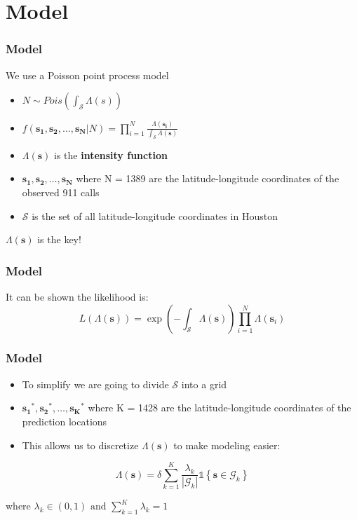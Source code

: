 \documentclass[10pt, compress]{beamer}
\begin{document}
  \section{Model}
  \begin{frame}
    \frametitle{Model}
    We use a Poisson point process model
      \begin{itemize}
        \item $N \sim Pois(\int_{\mathcal{S}} \Lambda(s))$
        \item $f(\mathbf{s_1}, \mathbf{s_2}, \dots, \mathbf{s_N}|N) = \prod_{i=1}^{N} \frac{\Lambda(\mathbf{s_i})}{\int_{\mathcal{S}}\Lambda(\mathbf{s})}$ 
        \item $\Lambda(\mathbf{s})$ is the \textbf{intensity function}
        \item $\mathbf{s_1}, \mathbf{s_2}, \dots, \mathbf{s_N}$ where N = 1389 are the latitude-longitude coordinates of the observed 911 calls
        \item $\mathcal{S}$ is the set of all latitude-longitude coordinates in Houston
      \end{itemize}
    \pause
    $\Lambda(\mathbf{s})$ is the key!
  \end{frame}
  \begin{frame}
    \frametitle{Model}
    It can be shown the likelihood is:
      $$L(\Lambda(\mathbf{s})) = \exp\left(-\int_{\mathcal{S}}\Lambda(\mathbf{s})\right) \prod_{i=1}^{N}\Lambda(\mathbf{s}_i)$$
  \end{frame}
  \begin{frame}
    \frametitle{Model}
    \begin{itemize}
      \item To simplify we are going to divide $\mathcal{S}$ into a grid
      \item $\mathbf{s_1}^{*}, \mathbf{s_2}^{*}, \dots, \mathbf{s_K}^{*}$ where K = 1428 are the latitude-longitude coordinates of the  prediction locations
      \item This allows us to discretize $\Lambda(\mathbf{s})$ to make modeling easier:
    \end{itemize}
        $$ \Lambda(\mathbf{s}) = \delta \sum_{k=1}^K \frac{\lambda_k}{|\mathcal{G}_k|} \mathds{1} \left\{ \mathbf{s} \in \mathcal{G}_k \right\} $$

    where $\lambda_k \in (0,1) \text{ and }\sum_{k=1}^K \lambda_k = 1$
  \end{frame}
\end{document}

